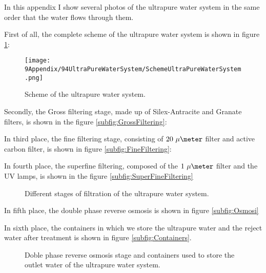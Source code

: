 In this appendix I show several photos of the ultrapure water system in the same order that the water flows through them.

First of all, the complete scheme of the ultrapure water system is shown in figure \ref{fig:SchemeUPWS}:

\begin{figure}[htbp]
\centering
\texttt{[image: 9Appendix/94UltraPureWaterSystem/SchemeUltraPureWaterSystem.png]}
\caption{Scheme of the ultrapure water system.\label{fig:SchemeUPWS}}
\end{figure}

Secondly, the Gross filtering stage, made up of Silex-Antracite and Granate filters, is shown in the figure \ref{subfig:GrossFiltering}:

In third place, the fine filtering stage, consisting of $20~\mu\meter$ filter and active carbon filter, is shown in figure \ref{subfig:FineFiltering}:

In fourth place, the superfine filtering, composed of the $1~\mu\meter$ filter and the UV lamps, is shown in the figure \ref{subfig:SuperFineFiltering}

\begin{figure}[htbp]
 \centering
 \caption{Different stages of filtration of the ultrapure water system.}
 \label{fig:UltraPureWaterStages}
\end{figure}

In fifth place, the double phase reverse osmosis is shown in figure \ref{subfig:Osmosi}

In sixth place, the containers in which we store the ultrapure water and the reject water after treatment is shown in figure \ref{subfig:Containers}.

\begin{figure}[htbp]
 \centering
 \caption{Doble phase reverse osmosis stage and containers used to store the outlet water of the ultrapure water system.}
 \label{subfig:OsmosisContainers}
\end{figure}

